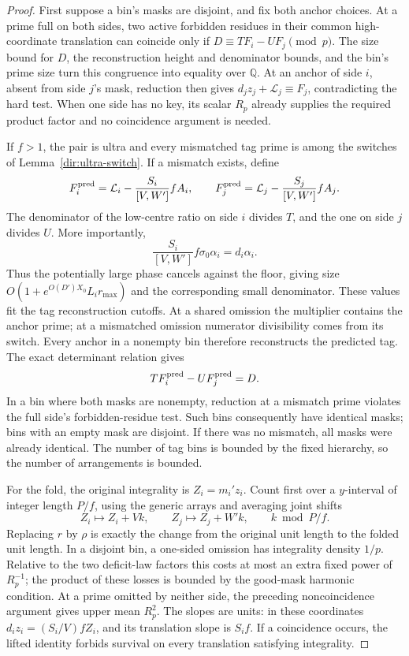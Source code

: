 \begin{proof}
First suppose a bin's masks are disjoint, and fix both anchor choices.
At a prime full on both sides, two active forbidden residues in their
common high-coordinate translation can coincide only if
$D\equiv TF_i-UF_j\pmod p$. The size bound for $D$, the reconstruction
height and denominator bounds, and the bin's prime size turn this
congruence into equality over $\mathbb Q$. At an anchor of side $i$,
absent from side $j$'s mask, reduction then gives
$d_j z_j+\mathcal L_j\equiv F_j$, contradicting the hard test. When one
side has no key, its scalar $R_p$ already supplies the required product
factor and no coincidence argument is needed.

If $f>1$, the pair is ultra and every mismatched tag prime is among the
switches of Lemma~\ref{dir:ultra-switch}. If a mismatch exists, define
\[
 F_i^{\rm pred}=\mathcal L_i-\frac{S_i}{[V,W']}f A_i,
 \qquad
 F_j^{\rm pred}=\mathcal L_j-\frac{S_j}{[V,W']}f A_j.
\]
The denominator of the low-centre ratio on side $i$ divides $T$, and the
one on side $j$ divides $U$. More importantly,
\[
 \frac{S_i}{[V,W']}f\sigma_0\alpha_i=d_i\alpha_i.
\]
Thus the potentially large phase cancels against the floor, giving size
$O(1+e^{O(D')X_0}L_i r_{\max})$ and the corresponding small denominator.
These values fit the tag reconstruction cutoffs. At a shared omission the
multiplier contains the anchor prime; at a mismatched omission numerator
divisibility comes from its switch. Every anchor in a nonempty bin
therefore reconstructs the predicted tag. The exact determinant relation
gives
\[
 T F_i^{\rm pred}-U F_j^{\rm pred}=D.
\]
In a bin where both masks are nonempty, reduction at a mismatch prime
violates the full side's forbidden-residue test. Such bins consequently
have identical masks; bins with an empty mask are disjoint. If there was
no mismatch, all masks were already identical. The number of tag bins is
bounded by the fixed hierarchy, so the number of arrangements is bounded.

For the fold, the original integrality is $Z_i=m_i'z_i$. Count first over
a $y$-interval of integer length $P/f$, using the generic arrays and
averaging joint shifts
\[
 Z_i\longmapsto Z_i+Vk,\qquad
 Z_j\longmapsto Z_j+W'k,\qquad k\bmod P/f.
\]
Replacing $r$ by $\rho$ is exactly the change from the original unit
length to the folded unit length. In a disjoint bin, a one-sided omission
has integrality density $1/p$. Relative to the two deficit-law factors
this costs at most an extra fixed power of $R_p^{-1}$; the product of
these losses is bounded by the good-mask harmonic condition. At a prime
omitted by neither side, the preceding noncoincidence argument gives
upper mean $R_p^2$. The slopes are units: in these coordinates
$d_i z_i=(S_i/V)fZ_i$, and its translation slope is $S_i f$. If a
coincidence occurs, the lifted identity forbids survival on every
translation satisfying integrality.


\end{proof}
